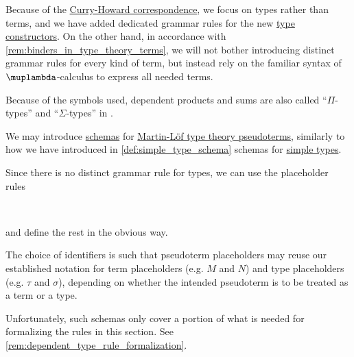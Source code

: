 \begin{comments}
  \item Because of the \hyperref[con:curry_howard_correspondence]{Curry-Howard correspondence}, we focus on types rather than terms, and we have added dedicated grammar rules for the new \hyperref[con:type_constructor]{type constructors}. On the other hand, in accordance with \cref{rem:binders_in_type_theory_terms}, we will not bother introducing distinct grammar rules for every kind of term, but instead rely on the familiar syntax of \( \muplambda \)-calculus to express all needed terms.

  \item Because of the symbols used, dependent products and sums are also called \enquote{\( \Pi \)-types} and \enquote{\( \Sigma \)-types} in \cite{UnivalentFoundationsProgram2013HoTT}.
\end{comments}

\begin{remark}\label{rem:pseudoterm_schemas}
  We may introduce \hyperref[con:schemas_and_instances]{schemas} for \hyperref[def:mltt_pseudoterm]{Martin-L\"of type theory pseudoterms}, similarly to how we have introduced in \cref{def:simple_type_schema} schemas for \hyperref[def:simple_type]{simple types}.

  Since there is no distinct grammar rule for types, we can use the placeholder rules
  \begin{bnf*}
       {} \\
     { \bnfor {}}
  \end{bnf*}
  and define the rest in the obvious way.

  The choice of identifiers is such that pseudoterm placeholders may reuse our established notation for term placeholders (e.g. \( M \) and \( N \)) and type placeholders (e.g. \( \tau \) and \( \sigma \)), depending on whether the intended pseudoterm is to be treated as a term or a type.

  Unfortunately, such schemas only cover a portion of what is needed for formalizing the rules in this section. See \cref{rem:dependent_type_rule_formalization}.
\end{remark}

